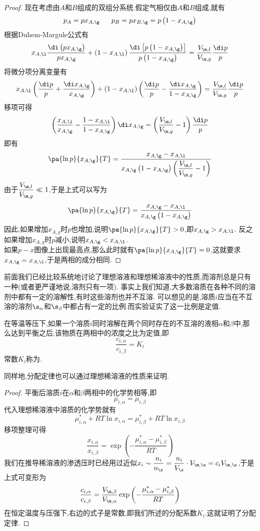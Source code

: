 \documentclass{ctexart}
\begin{document}
\begin{proof}
    现在考虑由$A$和$B$组成的双组分系统.假定气相仅由$A$和$B$组成,就有
    \[p_A=px_{A,\g}\ \ \ \ \ p_B=px_{B,\g}=p\left(1-x_{A,\g}\right)\]根据Duhem-Margule公式有
    \[x_{A,\l}\dfrac{\di\left(px_{A,\g}\right)}{px_{A,\g}}
    +\left(1-x_{A,\l}\right)\dfrac{\di\left[p\left(1-x_{A,\g}\right)\right]}{p\left(1-x_{A,\g}\right)}
    =\dfrac{V_{\m,l}}{V_{\m,g}}\dfrac{\di p}{p}\]
    将微分项分离变量有
    \[x_{A,\l}\left(\dfrac{\di p}{p}+\dfrac{\di x_{A,\g}}{x_{A,\g}}\right)+
    \left(1-x_{A,\l}\right)\left(\dfrac{\di p}{p}-\dfrac{\di x_{A,\g}}{1-x_{A,\g}}\right)
    =\dfrac{V_{\m,l}}{V_{\m,g}}\dfrac{\di p}{p}\]
    移项可得
    \[\left(\dfrac{x_{A,\l}}{x_{A,\g}}-\dfrac{1-x_{A,\l}}{1-x_{A,\g}}\right)\di x_{A,\g}
    =\left(\dfrac{V_{\m,l}}{V_{\m,g}}-1\right)\dfrac{\di p}{p}\]
    即有
    \[\pa{\ln p}{x_{A,\g}}{T}
    =\dfrac{x_{A,\g}-x_{A,\l}}{x_{A,\g}\left(1-x_{A,\g}\right)\left(\dfrac{V_{\m,l}}{V_{\m,g}}-1\right)}\]
    由于$\dfrac{V_{\m,l}}{V_{\m,g}}\ll1$,于是上式可以写为
    \[\pa{\ln p}{x_{A,\g}}{T}
    =\dfrac{x_{A,\g}-x_{A,\l}}{x_{A,\g}\left(1-x_{A,\g}\right)}\]
    因此,如果增加$x_{A,g}$时$p$也增加,说明$\pa{\ln p}{x_{A,\g}}{T}>0$,即$x_{A,\g}>x_{A,\l}$.%
    反之如果增加$x_{A,g}$时$p$减小,说明$x_{A,\g}<x_{A,\l}$.\\
    如果$p-x$图像上出现最高点,那么此时就有$\pa{\ln p}{x_{A,\g}}{T}=0$,这就要求$x_{A,\g}=x_{A,\l}$,于是两相的成分相同.
\end{proof}
\vspace{8pt}
\indent 前面我们已经比较系统地讨论了理想溶液和理想稀溶液中的性质,而溶剂总是只有一种(或者更严谨地说,溶剂只有一项).%
事实上我们知道,大多数溶质在各种不同的溶剂中都有一定的溶解性,有时这些溶剂也并不互溶.%
可以想见的是,溶质$i$应当在不互溶的溶剂$\s_\alpha$和$\s_\beta$中都占有一定的比例.而实验证实了这一比例是定值.
\begin{theorem}[4C.5.1 分配定律]
    在等温等压下,如果一个溶质$i$同时溶解在两个同时存在的不互溶的液相$\alpha$和$\beta$中,那么达到平衡之后,该物质在两相中的浓度之比为定值,即
    \[\dfrac{c_{i,\alpha}}{c_{i,\beta}}=K_i\]
    常数$K_i$称为.
\end{theorem}
同样地,分配定律也可以通过理想稀溶液的性质来证明.
\begin{proof}
    平衡后溶质$i$在$\alpha$和$\beta$两相中的化学势相等,即
    \[\mu_{i,\alpha}=\mu_{i,\beta}\]
    代入理想稀溶液中溶质的化学势就有
    \[\mu_{i,\alpha}^\ast+RT\ln x_{i,\alpha}=\mu_{i,\beta}^\ast+RT\ln x_{i,\beta}\]
    移项整理可得
    \[\dfrac{x_{i,\alpha}}{x_{i,\beta}}=\exp\left(-\dfrac{\mu_{i,\alpha}^\ast-\mu_{i,\beta}^\ast}{RT}\right)\]
    我们在推导稀溶液的渗透压时已经用过近似$x_i\sim\dfrac{n_i}{n_{\s}}=\dfrac{n_i}{V_\s}\cdot V_{\m,\s}=c_iV_{\m,\s}$,于是上式可变形为
    \[\dfrac{c_{i,\alpha}}{c_{i,\beta}}=\dfrac{V_{\m,\beta}}{V_{\m,\alpha}}\exp\left(-\dfrac{\mu_{i,\alpha}^\ast-\mu_{i,\beta}^\ast}{RT}\right)\]
    在恒定温度与压强下,右边的式子是常数,即我们所述的分配系数$K_i$.这就证明了分配定律.
\end{proof}
\end{document}

